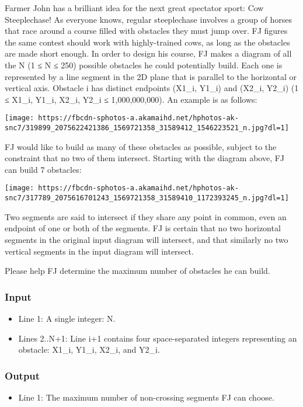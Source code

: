 



    Farmer John has a brilliant idea for the next great spectator sport: Cow Steeplechase! As everyone knows, regular steeplechase involves a group of horses that race around a course filled with obstacles they must jump over. FJ figures the same contest should work with highly-trained cows, as long as the obstacles are made short enough.  In order to design his course, FJ makes a diagram of all the N (1 ≤ N ≤ 250) possible obstacles he could potentially build. Each one is represented by a line segment in the 2D plane that is parallel to the horizontal or vertical axis. Obstacle i has distinct endpoints (X1\_i, Y1\_i) and (X2\_i, Y2\_i) (1 ≤ X1\_i, Y1\_i, X2\_i, Y2\_i ≤ 1,000,000,000). An example is as follows:   


\texttt{[image: https://fbcdn-sphotos-a.akamaihd.net/hphotos-ak-snc7/319899\_2075622421386\_1569721358\_31589412\_1546223521\_n.jpg?dl=1]}




    FJ would like to build as many of these obstacles as possible, subject to the constraint that no two of them intersect. Starting with the diagram above, FJ can build 7 obstacles:   


\texttt{[image: https://fbcdn-sphotos-a.akamaihd.net/hphotos-ak-snc7/317789\_2075616701243\_1569721358\_31589410\_1172393245\_n.jpg?dl=1]}




    Two segments are said to intersect if they share any point in common, even an endpoint of one or both of the segments.  FJ is certain that no two horizontal segments in the original input diagram will intersect, and that similarly no two vertical segments in the input diagram will intersect.   

    Please help FJ determine the maximum number of obstacles he can build.   

\subsubsection{   Input  }
\begin{itemize}
	\item      Line 1: A single integer: N.    
	\item      Lines 2..N+1: Line i+1 contains four space-separated integers         representing an obstacle: X1\_i, Y1\_i, X2\_i, and Y2\_i.    
\end{itemize}

\subsubsection{   Output  }
\begin{itemize}
	\item      Line 1: The maximum number of non-crossing segments FJ can choose.    
\end{itemize}

